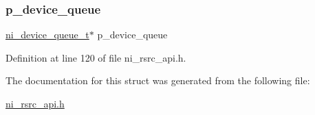\subsubsection{\texorpdfstring{p\_device\_queue}{p\_device\_queue}}
{\footnotesize\ttfamily \mbox{\hyperlink{ni__rsrc__api_8h_a9d2ed9ccf29349d91855dc9db68b3597}{ni\+\_\+device\+\_\+queue\+\_\+t}}$\ast$ p\+\_\+device\+\_\+queue}



Definition at line 120 of file ni\+\_\+rsrc\+\_\+api.\+h.



The documentation for this struct was generated from the following file\+:\begin{DoxyCompactItemize}
\item 
\mbox{\hyperlink{ni__rsrc__api_8h}{ni\+\_\+rsrc\+\_\+api.\+h}}\end{DoxyCompactItemize}
